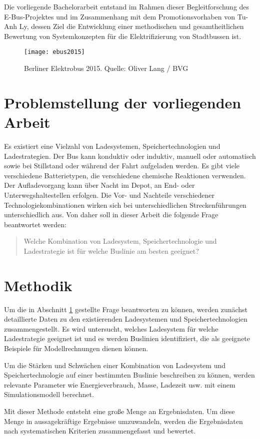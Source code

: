 Die vorliegende Bachelorarbeit entstand im Rahmen dieser Begleitforschung des E-Bus-Projektes und im Zusammenhang mit dem Promotionsvorhaben von Tu-Anh Ly, dessen Ziel die Entwicklung einer methodischen und gesamtheitlichen Bewertung von Systemkonzepten für die Elektrifizierung von Stadtbussen ist.%

\begin{figure}\centering
	\texttt{[image: ebus2015]}
	\caption[Berliner Elektrobus 2015]{Berliner Elektrobus 2015. Quelle: Oliver Lang / BVG}
	\label{abb_ebus2015}
\end{figure}

\section{Problemstellung der vorliegenden Arbeit}
\label{abs_problem}
Es existiert eine Vielzahl von Ladesystemen, Speichertechnologien und Ladestrategien. Der Bus kann konduktiv oder induktiv, manuell oder automatisch sowie bei Stillstand oder während der Fahrt aufgeladen werden. Es gibt viele verschiedene Batterietypen, die verschiedene chemische Reaktionen verwenden. Der Aufladevorgang kann über Nacht im Depot, an End- oder Unterwegshaltestellen erfolgen. Die Vor- und Nachteile verschiedener Technologiekombinationen wirken sich bei unterschiedlichen Streckenführungen unterschiedlich aus. Von daher soll in dieser Arbeit die folgende Frage beantwortet werden:
\begin{quote}
	Welche Kombination von Ladesystem, Speichertechnologie und Ladestrategie ist für welche Buslinie am besten geeignet?
\end{quote}

\section{Methodik}
Um die in Abschnitt \ref{abs_problem} gestellte Frage beantworten zu können, werden zunächst detaillierte Daten zu den existierenden Ladesystemen und Speichertechnologien zusammengestellt. Es wird untersucht, welches Ladesystem für welche Ladestrategie geeignet ist und es werden Buslinien identifiziert, die als geeignete Beispiele für Modellrechnungen dienen können.

Um die Stärken und Schwächen einer Kombination von Ladesystem und Speichertechnologie auf einer bestimmten Buslinie beschreiben zu können, werden relevante Parameter wie Energieverbrauch, Masse, Ladezeit usw. mit einem Simulationsmodell berechnet.

Mit dieser Methode entsteht eine große Menge an Ergebnisdaten. Um diese Menge in aussagekräftige Ergebnisse umzuwandeln, werden die Ergebnisdaten nach systematischen Kriterien zusammengefasst und bewertet.